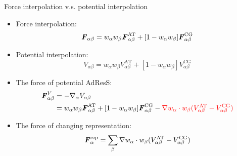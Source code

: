 \documentclass[]{beamer}
\newcommand{\redc}[1]{{\color{red} #1}}
\newcommand{\bluec}[1]{{\color{blue} #1}}
\newcommand{\vect}[1]{\textbf{\textit{#1}}}
\newcommand{\AT}{{\textrm{{AT}}}}
\newcommand{\CG}{{\textrm{CG}}}
\newcommand{\rep}{{\textrm{rep}}}
\begin{document}
\begin{frame}{Force interpolation v.s. potential interpolation}
  \begin{itemize}
  \item <1-> Force interpolation:
    \bluec{
      \begin{equation*}
        {\vect F}_{\alpha \beta}=w_\alpha w_\beta{\vect F}_{\alpha\beta}^{\AT}+[1-w_\alpha w_\beta]{\vect F}^{\CG}_{\alpha\beta}       
      \end{equation*}
    }
  \item <2-> Potential interpolation:
    \bluec{
      \begin{equation*}
        {V}_{\alpha \beta}=w_\alpha w_\beta{V}_{\alpha\beta}^{\AT}+[1-w_\alpha w_\beta]{V}^{\CG}_{\alpha\beta}        
      \end{equation*}
    }
  \item <3-> The force of potential AdResS:
    \bluec{
      \begin{align*}
        {\vect F}^V_{\alpha \beta}&= -\nabla_{\alpha}{V}_{\alpha \beta} \\
        &=w_\alpha w_\beta{\vect F}_{\alpha\beta}^{\AT}+[1-w_\alpha w_\beta]{\vect F}^{\CG}_{\alpha\beta}  - \redc{\nabla w_\alpha\cdot w_\beta (V^\AT_{\alpha \beta} - V^\CG_{\alpha \beta})}
      \end{align*}
    }
  \item <4-> The force of changing representation:
    \bluec{
      \begin{equation*}
        {\vect F}^{\rep}_\alpha = \sum_\beta \nabla w_\alpha \cdot w_\beta (V^\AT_{\alpha \beta} - V^\CG_{\alpha \beta})
      \end{equation*}
    }
  \end{itemize}
\end{frame}
\end{document}
